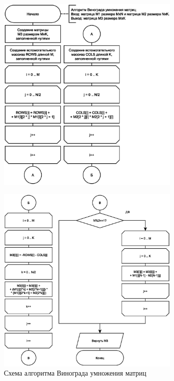 \clearpage

\begin{figure}[h]
    \centering
    \includegraphics[width=0.8\textwidth]{images/schemes/vinograd_mult_pt1.eps}
    \label{fig:scheme-2}
\end{figure}
\begin{figure}[h]
    \centering
    \includegraphics[width=0.8\textwidth]{images/schemes/vinograd_mult_pt2.eps}
    \caption{Схема алгоритма Винограда умножения матриц}
    \label{fig:scheme-3}
\end{figure}

